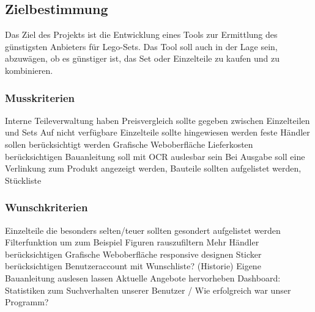 \subsection{Zielbestimmung}

Das Ziel des Projekts ist die Entwicklung eines Tools zur Ermittlung des günstigsten Anbieters für Lego-Sets. Das Tool soll auch in der Lage sein, abzuwägen, ob es günstiger ist, das Set oder Einzelteile zu kaufen und zu kombinieren.

\subsubsection{Musskriterien}
Interne Teileverwaltung haben \newline
Preisvergleich sollte gegeben zwischen Einzelteilen und Sets \newline
Auf nicht verfügbare Einzelteile sollte hingewiesen werden  feste Händler sollen berücksichtigt werden \newline
Grafische Weboberfläche \newline
Lieferkosten berücksichtigen \newline
Bauanleitung soll mit OCR auslesbar sein \newline
Bei Ausgabe soll eine Verlinkung zum Produkt angezeigt werden, Bauteile sollten aufgelistet werden, Stückliste \newline

\subsubsection{Wunschkriterien}
Einzelteile die besonders selten/teuer sollten gesondert aufgelistet werden \newline
Filterfunktion um zum Beispiel Figuren rauszufiltern \newline
Mehr Händler berücksichtigen \newline
Grafische Weboberfläche responsive designen \newline
Sticker berücksichtigen \newline
Benutzeraccount mit Wunschliste? (Historie) \newline
Eigene Bauanleitung auslesen lassen \newline
Aktuelle Angebote hervorheben \newline
Dashboard: Statistiken zum Suchverhalten unserer Benutzer / Wie erfolgreich war unser Programm? \newline

